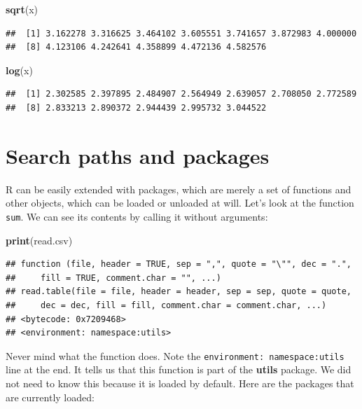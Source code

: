 \documentclass[]{book}
\newenvironment{Shaded}{\begin{snugshade}}{\end{snugshade}}
\newcommand{\KeywordTok}[1]{\textcolor[rgb]{0.13,0.29,0.53}{\textbf{{#1}}}}
\newcommand{\NormalTok}[1]{{#1}}
\theoremstyle{definition}
\theoremstyle{definition}
\theoremstyle{remark}
\begin{document}
\begin{Shaded}
\begin{Highlighting}[]
\KeywordTok{sqrt}\NormalTok{(x)  }
\end{Highlighting}
\end{Shaded}

\begin{verbatim}
##  [1] 3.162278 3.316625 3.464102 3.605551 3.741657 3.872983 4.000000
##  [8] 4.123106 4.242641 4.358899 4.472136 4.582576
\end{verbatim}

\begin{Shaded}
\begin{Highlighting}[]
\KeywordTok{log}\NormalTok{(x)   }
\end{Highlighting}
\end{Shaded}

\begin{verbatim}
##  [1] 2.302585 2.397895 2.484907 2.564949 2.639057 2.708050 2.772589
##  [8] 2.833213 2.890372 2.944439 2.995732 3.044522
\end{verbatim}

\section{Search paths and packages}\label{search-paths-and-packages}

R can be easily extended with packages, which are merely a set of
functions and other objects, which can be loaded or unloaded at will.
Let's look at the function \texttt{sum}. We can see its contents by
calling it without arguments:

\begin{Shaded}
\begin{Highlighting}[]
\KeywordTok{print}\NormalTok{(read.csv)}
\end{Highlighting}
\end{Shaded}

\begin{verbatim}
## function (file, header = TRUE, sep = ",", quote = "\"", dec = ".", 
##     fill = TRUE, comment.char = "", ...) 
## read.table(file = file, header = header, sep = sep, quote = quote, 
##     dec = dec, fill = fill, comment.char = comment.char, ...)
## <bytecode: 0x7209468>
## <environment: namespace:utils>
\end{verbatim}

Never mind what the function does. Note the
\texttt{environment:\ namespace:utils} line at the end. It tells us that
this function is part of the \textbf{utils} package. We did not need to
know this because it is loaded by default. Here are the packages that
are currently loaded:
\end{document}
